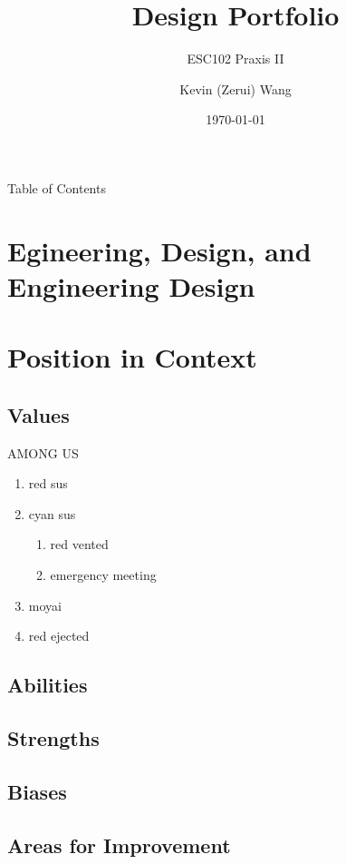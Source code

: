 \documentclass[aspectratio=1610]{beamer}
\title[Student Engineer Design Portfolio]{Design Portfolio}
\subtitle{ESC102 Praxis II}
\author[Page \insertframenumber]{Kevin (Zerui) Wang}
\institute{University of Toronto}
\date{\today}
\begin{document}
{
\begin{frame}
\titlepage
\end{frame}
}
\addtocounter{framenumber}{-1}

{
\begin{frame}{Table of Contents}
    \tableofcontents
\end{frame}
}

\section{Egineering, Design, and Engineering Design}

\section{Position in Context}
\subsection{Values}

\begin{frame}
   AMONG US
   \begin{enumerate}[I]
    \item red sus
    \item cyan sus
    \begin{enumerate}[i]
    \item red vented
    \item emergency meeting
    \end{enumerate}
    \item moyai
    \item red ejected
    \end{enumerate}
\end{frame}
\subsection{Abilities}
\subsection{Strengths}
\subsection{Biases}
\subsection{Areas for Improvement}
\end{document}

